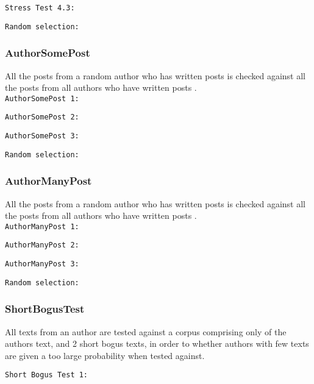 \texttt{Stress Test 4.3:}\nl
\nl

\texttt{Random selection:}\nl


\subsubsection{AuthorSomePost}
All the posts from a random author who has written  posts is checked against all the posts from all authors who have written  posts .\\  

\texttt{AuthorSomePost 1:}\nl
\nl

\texttt{AuthorSomePost 2:}\nl
\nl

\texttt{AuthorSomePost 3:}\nl
\nl

\texttt{Random selection:}\nl


\subsubsection{AuthorManyPost}
All the posts from a random author who has written  posts is checked against all the posts from all authors who have written  posts .\\  

\texttt{AuthorManyPost 1:}\nl
\nl

\texttt{AuthorManyPost 2:}\nl
\nl

\texttt{AuthorManyPost 3:}\nl
\nl

\texttt{Random selection:}\nl


\subsubsection{ShortBogusTest}
All texts from an author are tested against a corpus comprising only of the authors text, and 2 short bogus texts, in order to whether authors with few texts are given a too large probability when tested against. 

\texttt{Short Bogus Test 1:}\nl
\nl

